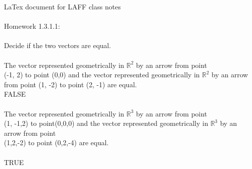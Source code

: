 \documentclass[11pt]{article}
\begin{document}
LaTex document for LAFF class notes
\\
\\
Homework 1.3.1.1:
\\
\\
Decide if the two vectors are equal.
\\
\\The vector represented geometrically in 
$\mathbb{R}^2$
by an arrow from point    
\\(-1, 2) to point (0,0) and the vector represented geometrically 
in 
$\mathbb{R}^2$
by an arrow from point (1, -2) to point (2, -1) are equal.\linebreak\\FALSE\\
\\The vector represented geometrically in 
$\mathbb{R}^3$
by an arrow from point
\\(1, -1,2) to point(0,0,0) and the vector represented
geometrically in 
$\mathbb{R}^3$
by an arrow from point
\\(1,2,-2) to point (0,2,-4) are equal.\\
\\TRUE
\end{document}
